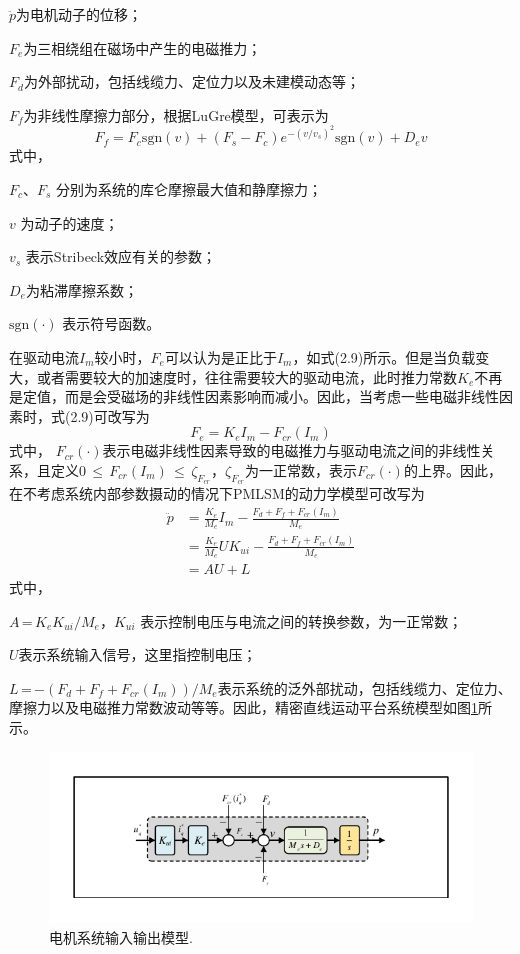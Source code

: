 $\ddot{p}$为电机动子的位移；

$F_e$为三相绕组在磁场中产生的电磁推力；

$F_d$为外部扰动，包括线缆力、定位力以及未建模动态等；

$F_f$为非线性摩擦力部分，根据LuGre模型\cite{de1995new}，可表示为
\begin{equation}
\label{2.11}
{{F}_{f}}={{F}_{c}}\text{sgn}(v)+({{F}_{s}}-{{F}_{c}}){{e}^{-{{(v/{{v}_{s}})}^{2}}}}\text{sgn}(v)+{D_e}v
\end{equation}
式中，

$F_c$、$F_s$ 分别为系统的库仑摩擦最大值和静摩擦力；

$v$ 为动子的速度；

$v_s$ 表示Stribeck效应有关的参数；

$D_e$为粘滞摩擦系数；

$\text{sgn}(\cdot)$ 表示符号函数。

在驱动电流$I_m$较小时，$F_e$可以认为是正比于$I_m$，如式(2.9)所示。但是当负载变大，或者需要较大的加速度时，往往需要较大的驱动电流，此时推力常数$K_e$不再是定值，而是会受磁场的非线性因素影响而减小。因此，当考虑一些电磁非线性因素时，式(2.9)可改写为
\begin{equation}
F_e=K_eI_m-F_{cr}(I_m)
\end{equation}
式中，
$F_{cr}(\cdot)$表示电磁非线性因素导致的电磁推力与驱动电流之间的非线性关系，且定义$0$$\,$${\le}\,F_{cr}(I_m)$$\,$${\le}\,\zeta_{F_{cr}}$，$\zeta_{F_{cr}}$为一正常数，表示$F_{cr}(\cdot)$的上界。因此，在不考虑系统内部参数摄动的情况下PMLSM的动力学模型可改写为
\begin{equation}
\begin{aligned}
\ddot{p}&=\frac{{{K}_{e}}}{M_e}I_m-\frac{{{F}_{d}}+{{F}_{f}}+{{F}_{cr}}(I_m)}{M_e} \\ 
&=\frac{{{K}_{e}}}{M_e}U{{K}_{ui}}-\frac{{{F}_{d}}+{{F}_{f}}+{{F}_{cr}}(I_m)}{M_e} \\ 
&=AU+L  
\end{aligned}
\end{equation}
式中，

$A$$\,$=$\,$${{K}_{e}}{{K}_{ui}}/M_e$，$K_{ui}$ 表示控制电压与电流之间的转换参数，为一正常数；

$U$表示系统输入信号，这里指控制电压； 

$L$$\,$=$\,$$-(F_d+F_f+F_{cr}(I_m))/M_e$表示系统的泛外部扰动，包括线缆力、定位力、摩擦力以及电磁推力常数波动等等。因此，精密直线运动平台系统模型如图\ref{电机系统模型}所示。
\begin{figure}[H]
	\centering
	\includegraphics[width=12cm]{figures/电机数学模型}
	\caption{电机系统输入输出模型.}
	\label{电机系统模型}
\end{figure}

